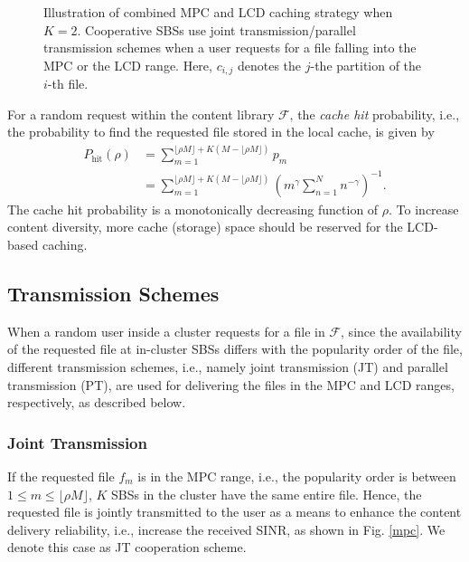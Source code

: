 \documentclass[twocolumns,10pt]{IEEEtran}
\begin{document}
\begin{figure}
	\centering
	\caption{Illustration of combined MPC and LCD caching strategy when $K=2$. Cooperative SBSs use joint transmission/parallel transmission schemes when a user requests for a file falling into the MPC or the LCD range. Here, $c_{i,j}$ denotes the $j$-the partition of the $i$-th file.}
\end{figure}

For a random request within the content library $\mathcal{F}$, the {\emph{cache hit}} probability, i.e., the probability to find the requested file stored in the local cache, is given by
\begin{align}
P_{\text{hit}}(\rho)
&=\sum\limits_{m=1}^{\lfloor \rho M\rfloor+K(M-\lfloor \rho M\rfloor)} p_m \nonumber \\
&=\sum\limits_{m=1}^{\lfloor \rho M\rfloor+K(M-\lfloor \rho M\rfloor)}  \left(m^{\gamma} \sum\limits_{n=1}^{N}n^{-\gamma}\right)^{-1}. 
\label{proba_hit}
\end{align} 
The cache hit probability is a monotonically decreasing function of $\rho$. To increase content diversity, more cache (storage) space should be reserved for the LCD-based caching.


\subsection{Transmission Schemes}
\label{section_transmission}
When a random user inside a cluster requests for a file in $\mathcal{F}$, since the availability of the requested file at in-cluster SBSs differs with the popularity order of the file, different transmission schemes, i.e., namely joint transmission (JT) and parallel transmission (PT), are used for delivering the files in the MPC and LCD ranges, respectively, as described below. 

\subsubsection{Joint Transmission}
If the requested file $f_m$ is in the MPC range, i.e., the popularity order is between $1\leq m\leq \lfloor\rho M \rfloor$, $K$ SBSs in the cluster have the same entire file. Hence, the requested file is jointly transmitted to the user as a means to enhance the content delivery reliability, i.e., increase the received SINR, as shown in Fig. \ref{mpc}. We denote this case as JT cooperation scheme. 
\end{document}
